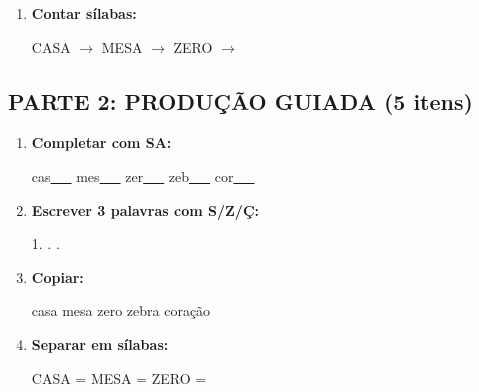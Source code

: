 \begin{exercicio}
\begin{enumerate}
  \item \textbf{Contar sílabas:}
  \begin{center}
  CASA $\rightarrow$ \underline{\hspace{0.9cm}} \quad MESA $\rightarrow$ \underline{\hspace{0.9cm}} \quad ZERO $\rightarrow$ \underline{\hspace{0.9cm}}
  \end{center}

\end{enumerate}

\subsection*{PARTE 2: PRODUÇÃO GUIADA (5 itens)}

\begin{enumerate}[resume]

  \item \textbf{Completar com SA:}
  \begin{center}
  cas\underline{~~~} \quad mes\underline{~~~} \quad zer\underline{~~~} \quad zeb\underline{~~~} \quad cor\underline{~~~}
  \end{center}

  \item \textbf{Escrever 3 palavras com S/Z/Ç:}
  \begin{center}
  1. \underline{\hspace{3cm}} . \underline{\hspace{3cm}} . \underline{\hspace{3cm}}
  \end{center}

  \item \textbf{Copiar:}
  \begin{center}
  casa \quad mesa \quad zero \quad zebra \quad coração
  \end{center}

  \item \textbf{Separar em sílabas:}
  \begin{center}
  CASA = \underline{\hspace{1cm}} \underline{\hspace{1cm}} \quad MESA = \underline{\hspace{1cm}} \underline{\hspace{1cm}} \quad ZERO = \underline{\hspace{1cm}} \underline{\hspace{1cm}}
  \end{center}


\end{enumerate}
\end{exercicio}
